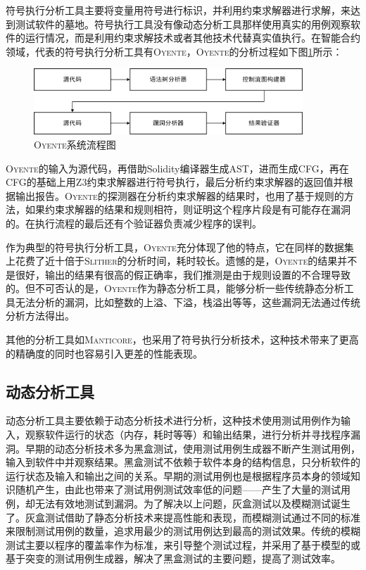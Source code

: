 符号执行分析工具主要将变量用符号进行标识，并利用约束求解器进行求解，来达到测试软件的墓地。符号执行工具没有像动态分析工具那样使用真实的用例观察软件的运行情况，而是利用约束求解技术或者其他技术代替真实值执行。在智能合约领域，代表的符号执行分析工具有\textsc{Oyente}，\textsc{Oyente}的分析过程如下图\ref{fig:oyente_process}所示：

\begin{figure}
\vspace{+2mm}
  \centering
  \includegraphics[width=0.9\textwidth]{figures/oyente_process.png}
  \caption{\textsc{Oyente}系统流程图}
  \label{fig:oyente_process}
\vspace{-5mm}
\end{figure}

\textsc{Oyente}的输入为源代码，再借助Solidity编译器生成AST，进而生成CFG，再在CFG的基础上用Z3约束求解器进行符号执行，最后分析约束求解器的返回值并根据输出报告。\textsc{Oyente}的探测器在分析约束求解器的结果时，也用了基于规则的方法，如果约束求解器的结果和规则相符，则证明这个程序片段是有可能存在漏洞的。在执行流程的最后还有个验证器负责减少程序的误判。

作为典型的符号执行分析工具，\textsc{Oyente}充分体现了他的特点，它在同样的数据集上花费了近十倍于\textsc{Slither}的分析时间，耗时较长。遗憾的是，\textsc{Oyente}的结果并不是很好，输出的结果有很高的假正确率，我们推测是由于规则设置的不合理导致的。但不可否认的是，\textsc{Oyente}作为静态分析工具，能够分析一些传统静态分析工具无法分析的漏洞，比如整数的上溢、下溢，栈溢出等等，这些漏洞无法通过传统分析方法得出。

其他的分析工具如\textsc{Manticore}，也采用了符号执行分析技术，这种技术带来了更高的精确度的同时也容易引入更差的性能表现。

\subsection{动态分析工具}

动态分析工具主要依赖于动态分析技术进行分析，这种技术使用测试用例作为输入，观察软件运行的状态（内存，耗时等等）和输出结果，进行分析并寻找程序漏洞。早期的动态分析技术多为黑盒测试，使用测试用例生成器不断产生测试用例，输入到软件中并观察结果。黑盒测试不依赖于软件本身的结构信息，只分析软件的运行状态及输入和输出之间的关系。早期的测试用例也是根据程序员本身的领域知识随机产生，由此也带来了测试用例测试效率低的问题——产生了大量的测试用例，却无法有效地测试到漏洞。为了解决以上问题，灰盒测试以及模糊测试诞生了。灰盒测试借助了静态分析技术来提高性能和表现，而模糊测试通过不同的标准来限制测试用例的数量，追求用最少的测试用例达到最高的测试效果。传统的模糊测试主要以程序的覆盖率作为标准，来引导整个测试过程，并采用了基于模型的或基于突变的测试用例生成器，解决了黑盒测试的主要问题，提高了测试效率。

